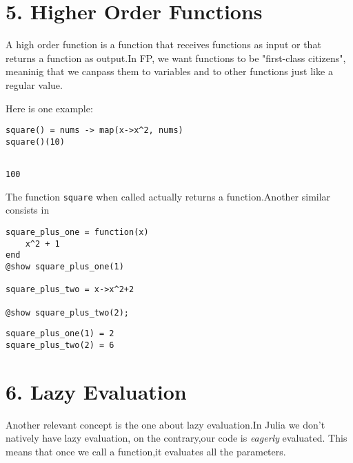 \section{5. Higher Order Functions}


A high order function is a function that receives functions as input or that returns a function as output.In FP, we want functions to be "first-class citizens", meaninig that we canpass them to variables and to other functions just like a regular value.

Here is one example:
\bigskip
\begin{lstlisting}[language=JuliaLocal, style=julia, texcl=true]
square() = nums -> map(x->x^2, nums)
square()(10)
\end{lstlisting}

\begingroup

\fontsize{10pt}{12pt}\selectfont

\begin{verbatim}

100
\end{verbatim}

\endgroup
The function \lstinline[style=julia]{square} when called actually returns a function.Another similar consists in
\bigskip
\begin{lstlisting}[language=JuliaLocal, style=julia, texcl=true]
square_plus_one = function(x)
    x^2 + 1
end
@show square_plus_one(1)

square_plus_two = x->x^2+2

@show square_plus_two(2);
\end{lstlisting}

\begingroup

\fontsize{10pt}{12pt}\selectfont

\begin{verbatim}
square_plus_one(1) = 2
square_plus_two(2) = 6

\end{verbatim}

\endgroup

\section{6. Lazy Evaluation}


Another relevant concept is the one about lazy evaluation.In Julia we don't natively have lazy evaluation, on the contrary,our code is \textit{eagerly} evaluated. This means that once we call a function,it evaluates all the parameters.

